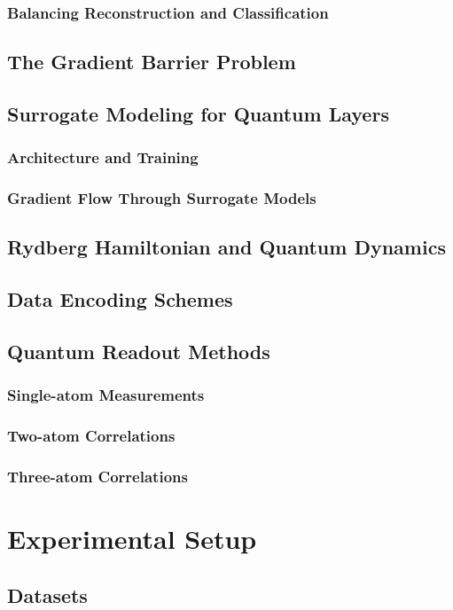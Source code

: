 \documentclass[conference]{IEEEtran}
\begin{document}
\subsubsection{Balancing Reconstruction and Classification}
\subsection{The Gradient Barrier Problem}
\subsection{Surrogate Modeling for Quantum Layers}
\subsubsection{Architecture and Training}
\subsubsection{Gradient Flow Through Surrogate Models}
\subsection{Rydberg Hamiltonian and Quantum Dynamics}
\subsection{Data Encoding Schemes}
\subsection{Quantum Readout Methods}
\subsubsection{Single-atom Measurements}
\subsubsection{Two-atom Correlations}
\subsubsection{Three-atom Correlations}

\section{Experimental Setup}
\subsection{Datasets}
\end{document}
